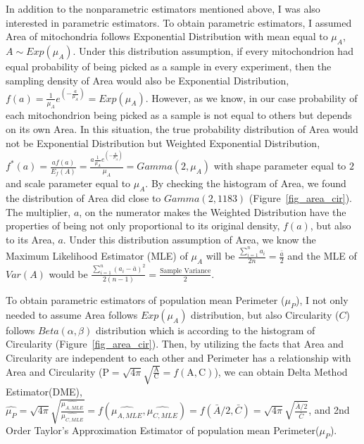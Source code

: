 \documentclass{article}\usepackage[]{graphicx}\usepackage[]{color}
\numberwithin{figure}{subsection} %
\numberwithin{table}{subsection} %
\begin{document}
In addition to the nonparametric estimators mentioned above, I was also interested in parametric estimators. To obtain parametric estimators, I assumed Area of mitochondria follows Exponential Distribution with mean equal to ${\mu}_{A}$, $A\sim Exp({\mu}_{A})$. Under this distribution assumption, if every mitochondrion had equal probability of being picked as a sample in every experiment, then the sampling density of Area would also be Exponential Distribution, $f(a) = \frac{1}{{\mu}_{A}}{e}^{(-\frac{a}{{\mu}_{A}})} = Exp({\mu}_{A})$. However, as we know, in our case probability of each mitochondrion being picked as a sample is not equal to others but depends on its own Area. In this situation, the true probability distribution of Area would not be Exponential Distribution but Weighted Exponential Distribution, ${f}^{\ast}(a)=\frac{af(a)}{{E}_{f}(A)}=\frac{a\frac{1}{{\mu}_{A}}{e}^{(-\frac{a}{{\mu}_{A}})}}{{\mu}_{A}} = Gamma(2, {\mu}_{A})$ with shape parameter equal to $2$ and scale parameter equal to ${\mu}_{A}$. By checking the histogram of Area, we found the distribution of Area did close to $Gamma(2, 1183)$ (Figure~\ref{fig_area_cir}). The multiplier, $a$, on the numerator makes the Weighted Distribution have the properties of being not only proportional to its original density, $f(a)$, but also to its Area, $a$. Under this distribution assumption of Area, we know the Maximum Likelihood Estimator (MLE) of ${\mu}_{A}$ will be $\frac{\sum_{i=1}^{n} {a}_{i}}{2n}=\frac{\bar{a}}{2}$ and the MLE of $Var(A)$ would be $\frac{\sum_{i=1}^{n}{({a}_{i}-\bar{a})}^2}{2(n-1)}=\frac{\text{Sample Variance}}{2}$.

To obtain parametric estimators of population mean Perimeter (${\mu}_{P}$), I not only needed to assume Area follows $Exp({\mu}_{A})$ distribution, but also Circularity ($C$) follows $Beta(\alpha,\beta)$ distribution which is according to the histogram of Circularity (Figure~\ref{fig_area_cir}). Then, by utilizing the facts that Area and Circularity are independent to each other and Perimeter has a relationship with Area and Circularity ($\text{P}=\sqrt{4\pi}\sqrt{\frac{\text{A}}{\text{C}}}=f(\text{A}, \text{C})$), we can obtain Delta Method Estimator(DME), $\widehat{{\mu}_{P}}=\sqrt{4\pi}\sqrt{\frac{\widehat{{\mu}_{A,MLE}}}{\widehat{{\mu}_{C,MLE}}}}=f(\widehat{{\mu}_{A,MLE}}, \widehat{{\mu}_{C,MLE}})=f(\bar{A}/2, \bar{C})=\sqrt{4\pi}\sqrt{\frac{\bar{A}/2}{\bar{C}}}$, and 2nd Order Taylor's Approximation Estimator of population mean Perimeter(${\mu}_{P}$). 
\end{document}
